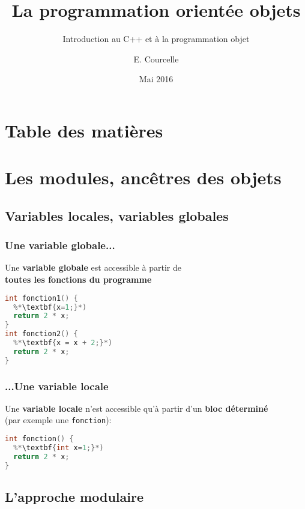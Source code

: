\documentclass{beamer}
\title{La programmation orientée objets}
\subtitle{Introduction au C++ et à la programmation objet}
\author{E. Courcelle}\institute{CALMIP, URA 3667}
\date{Mai 2016}
\begin{document}
\begin{frame}
\titlepage
\end{frame}

\section*{Table des matières}
\begin{frame}
\tableofcontents
\end{frame}

\section{Les modules, ancêtres des objets}

\subsection{Variables locales, variables globales}

\begin{frame}[fragile=singleslide,shrink=20]
\frametitle {Une variable globale...}
Une \textbf{variable globale} est accessible à partir de \\ \textbf{toutes les fonctions du programme}
\begin{lstlisting}[language=c++]
  %*\textbf{int x=0};*)
int fonction1() {
  %*\textbf{x=1;}*)
  return 2 * x;         
}
int fonction2() {
  %*\textbf{x = x + 2;}*)
  return 2 * x;         
}  
\end{lstlisting}
\end{frame}

\begin{frame}[fragile=singleslide,shrink=20]
\frametitle {...Une variable locale}
Une \textbf{variable locale} n'est accessible qu'à partir d'un \textbf{bloc déterminé} \\
(par exemple une \texttt{fonction}):
\begin{lstlisting}[language=c++]
int fonction() {
  %*\textbf{int x=1;}*)
  return 2 * x;         
}
\end{lstlisting}
\end{frame}

\subsection{L'approche modulaire}
\end{document}
